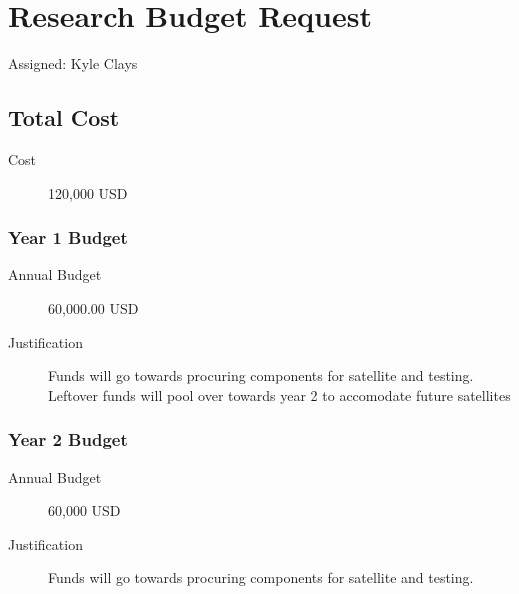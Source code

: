 \section{Research Budget Request}
Assigned: Kyle Clays

\subsection{Total Cost}
\begin{description}
\item[Cost] 120,000 USD
\end{description}

\subsubsection{Year 1 Budget}
\begin{description}
\item[Annual Budget] 60,000.00 USD
\item[Justification] Funds will go towards procuring components for satellite and testing. Leftover funds will pool over towards year 2 to accomodate future satellites
\end{description}

\subsubsection{Year 2 Budget}
\begin{description}
\item[Annual Budget] 60,000 USD
\item[Justification] Funds will go towards procuring components for satellite and testing.
\end{description}

